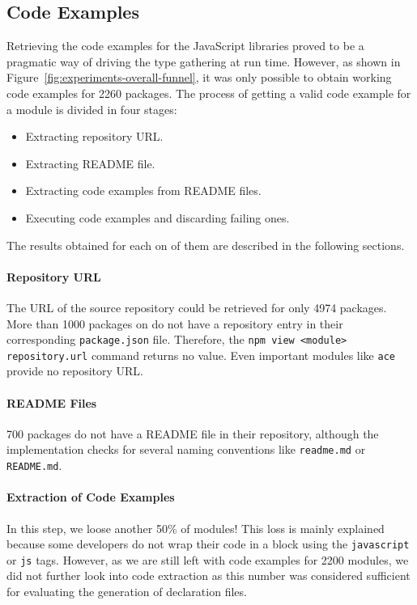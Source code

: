 \documentclass[english,cleveref,autoref,submission]{programming}
\newcommand{\figref}[1]{Figure~\ref{#1}}
\begin{document}
\subsection{Code Examples}
Retrieving the code examples for the JavaScript libraries proved to be
a pragmatic way of driving the type gathering at run time. However, as
shown in \figref{fig:experiments-overall-funnel}, it was only possible
to obtain working code examples for 2260 packages. The
process of getting a valid code example for a module is divided in four
stages: 
\begin{itemize}
\item Extracting repository URL.
\item Extracting README file.
\item Extracting code examples from README files.
\item Executing code examples and discarding failing ones.
\end{itemize}

The results obtained for each on of them are described in the
following sections. 

\paragraph*{Repository URL}
The URL of the source repository could be retrieved for only 4974
packages. More than 1000 packages on \NPM{} do not have a repository
entry in their corresponding \texttt{package.json} file. Therefore, the
\texttt{npm view <module> repository.url} command returns no
value. Even important modules like \texttt{ace} provide no repository URL.

\paragraph*{README Files}
700 packages do not have a README file in their repository, although
the implementation checks for several naming conventions like
\texttt{readme.md} or \texttt{README.md}. 

\paragraph*{Extraction of Code Examples}
In this step, we loose another 50\% of modules! This loss is mainly
explained because some developers do not wrap their code in a block
using the \texttt{javascript} or \texttt{js} tags. However, as we are
still left with code examples for 2200 modules, we did not further
look into code extraction as this number was considered sufficient for
evaluating the generation of declaration files. 
\end{document}
